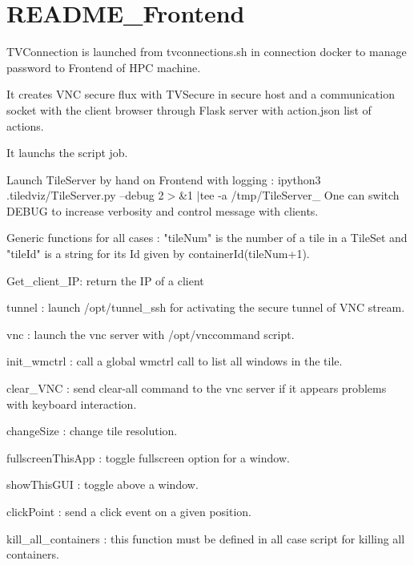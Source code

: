 \chapter{README\+\_\+\+Frontend }
\hypertarget{md__2local_2home_2ll288128_2Projets_2TiledViz_2TVConnections_2README__Frontend}{}\label{md__2local_2home_2ll288128_2Projets_2TiledViz_2TVConnections_2README__Frontend}
TVConnection is launched from tvconnections.\+sh in connection docker to manage password to Frontend of HPC machine.

It creates VNC secure flux with TVSecure in secure host and a communication socket with the client browser through Flask server with action.\+json list of actions.

It launchs the script job.

Launch Tile\+Server by hand on Frontend with logging :\+ ipython3 .tiledviz/\+\+Tile\+Server.\+py --debug 2\texorpdfstring{$>$}{>}\&1 \texorpdfstring{$\vert$}{|}tee -\/a /\+tmp/\+\+Tile\+Server\+\_\+ One can switch DEBUG to increase verbosity and control message with clients.

Generic functions for all cases :\+ "{}tile\+Num"{} is the number of a tile in a Tile\+Set and "{}tile\+Id"{} is a string for its Id given by container\+Id(tile\+Num+1).


\begin{DoxyItemize}
\item Get\+\_\+client\+\_\+\+IP:\+ return the IP of a client
\item tunnel :\+ launch /\+opt/\+tunnel\+\_\+ssh for activating the secure tunnel of VNC stream.
\item vnc :\+ launch the vnc server with /\+opt/\+vnccommand script.
\item init\+\_\+wmctrl :\+ call a global wmctrl call to list all windows in the tile.
\item clear\+\_\+\+VNC :\+ send clear-\/all command to the vnc server if it appears problems with keyboard interaction.
\item change\+Size :\+ change tile resolution.
\item fullscreen\+This\+App :\+ toggle fullscreen option for a window.
\item show\+This\+GUI :\+ toggle above a window.
\item click\+Point :\+ send a click event on a given position.
\item kill\+\_\+all\+\_\+containers :\+ this function must be defined in all case script for killing all containers.
\end{DoxyItemize}

